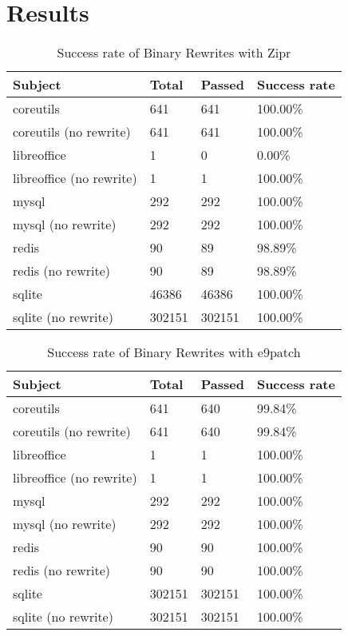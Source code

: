 \documentclass[a4paper,11pt,oneside]{report}
\begin{document}
\chapter{Results}

\begin{table}[h]
    \centering
    \caption{Success rate of Binary Rewrites with Zipr}
    \begin{tabular}{|l|l|l|l|}
    \hline
    Subject & Total & Passed & Success rate \\ \hline
    coreutils & 641 & 641 & 100.00\% \\ \hline
    coreutils (no rewrite) & 641 & 641 & 100.00\% \\ \hline
    libreoffice & 1 & 0 & 0.00\% \\ \hline
    libreoffice (no rewrite) & 1 & 1 & 100.00\% \\ \hline
    mysql & 292 & 292 & 100.00\% \\ \hline
    mysql (no rewrite) & 292 & 292 & 100.00\% \\ \hline
    redis & 90 & 89 & 98.89\% \\ \hline
    redis (no rewrite) & 90 & 89 & 98.89\% \\ \hline
    sqlite & 46386 & 46386 & 100.00\% \\ \hline
    sqlite (no rewrite) & 302151 & 302151 & 100.00\% \\ \hline
    \end{tabular}
    \end{table}
    
    \begin{table}[h]
    \centering
    \caption{Success rate of Binary Rewrites with e9patch}
    \begin{tabular}{|l|l|l|l|}
    \hline
    Subject & Total & Passed & Success rate \\ \hline
    coreutils & 641 & 640 & 99.84\% \\ \hline
    coreutils (no rewrite) & 641 & 640 & 99.84\% \\ \hline
    libreoffice & 1 & 1 & 100.00\% \\ \hline
    libreoffice (no rewrite) & 1 & 1 & 100.00\% \\ \hline
    mysql & 292 & 292 & 100.00\% \\ \hline
    mysql (no rewrite) & 292 & 292 & 100.00\% \\ \hline
    redis & 90 & 90 & 100.00\% \\ \hline
    redis (no rewrite) & 90 & 90 & 100.00\% \\ \hline
    sqlite & 302151 & 302151 & 100.00\% \\ \hline
    sqlite (no rewrite) & 302151 & 302151 & 100.00\% \\ \hline
    \end{tabular}
    \end{table}
    
\end{document}
